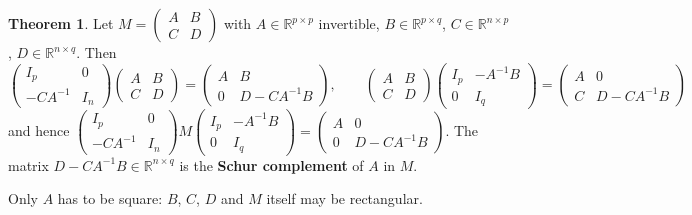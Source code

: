 \documentclass[12pt]{article}
\newcommand{\R}{\mathbb R}
\theoremstyle{definition}
\newtheorem{theorem}{Theorem}
\begin{document}
\begin{theorem}\label{r5b-thm-schur}
Let \(M=\begin{pmatrix}A&B\\C&D\end{pmatrix}\) with \(A\in\R^{p\times p}\) invertible,
\(B\in\R^{p\times q}\), \(C\in\R^{n\times p}\), \(D\in\R^{n\times q}\). Then
\[
\begin{pmatrix}I_p&0\\-CA^{-1}&I_n\end{pmatrix}\begin{pmatrix}A&B\\C&D\end{pmatrix}
=\begin{pmatrix}A&B\\0&D-CA^{-1}B\end{pmatrix},\qquad
\begin{pmatrix}A&B\\C&D\end{pmatrix}\begin{pmatrix}I_p&-A^{-1}B\\0&I_q\end{pmatrix}
=\begin{pmatrix}A&0\\C&D-CA^{-1}B\end{pmatrix}
\]
and hence
\(\left(\begin{smallmatrix}I_p&0\\-CA^{-1}&I_n\end{smallmatrix}\right)M\left(\begin{smallmatrix}I_p&-A^{-1}B\\0&I_q\end{smallmatrix}\right)
=\left(\begin{smallmatrix}A&0\\0&D-CA^{-1}B\end{smallmatrix}\right)\). The matrix
\(D-CA^{-1}B\in\R^{n\times q}\) is the \textbf{Schur complement} of \(A\) in \(M\).
\end{theorem}
Only \(A\) has to be square: \(B\), \(C\), \(D\) and \(M\) itself may be rectangular.
\end{document}
